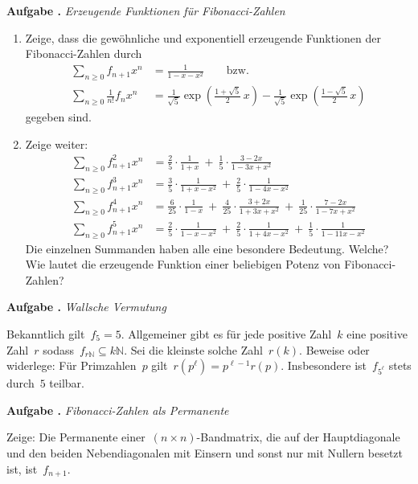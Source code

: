 \documentclass[a4paper,ngerman]{scrartcl}
\newlength{\aufgabenskip}
\newcounter{aufgabennummer}
\newenvironment{aufgabe}[1]{
  \addtocounter{aufgabennummer}{1}
  \textbf{Aufgabe \theaufgabennummer.} \emph{#1} \par
}{\vspace{\aufgabenskip}}
\newcommand{\NN}{\mathbb{N}}
\begin{document}
\begin{aufgabe}{Erzeugende Funktionen für Fibonacci-Zahlen}
\begin{enumerate}
\item Zeige, dass die gewöhnliche und exponentiell erzeugende Funktionen der
Fibonacci-Zahlen durch
\begin{align*}
  \sum_{n\geq 0} f_{n+1}x^n &= \frac{1}{1-x-x^2} \qquad\text{bzw.} \\
  \sum_{n\geq 0} \tfrac{1}{n!}f_n x^n &= \tfrac{1}{\sqrt{5}}\exp\left(\tfrac{1+\sqrt{5}}{2}\, x\right) - \tfrac{1}{\sqrt{5}}\exp\left(\tfrac{1-\sqrt{5}}{2}\, x\right)
\end{align*}
gegeben sind.
\item Zeige weiter:
\begin{align*}
\sum_{n\geq 0} f_{n+1}^2x^n &= \frac{2}{5}\cdot\frac{1}{1+x}\ +\ \frac{1}{5}\cdot\frac{3-2x}{1-3x+x^2}\\
\sum_{n\geq 0} f_{n+1}^3x^n &= \frac{3}{5}\cdot\frac{1}{1+x-x^2}\ +\ \frac{2}{5}\cdot\frac{1}{1-4x-x^2} \\
\sum_{n\geq 0} f_{n+1}^4x^n &= \frac{6}{25}\cdot\frac{1}{1-x}\ +\ \frac{4}{25}\cdot\frac{3+2x}{1+3x+x^2}\ +\ \frac{1}{25}\cdot\frac{7-2x}{1-7x+x^2}\\
\sum_{n\geq 0} f_{n+1}^5x^n &= \frac{2}{5}\cdot\frac{1}{1-x-x^2}\ +\ \frac{2}{5}\cdot\frac{1}{1+4x-x^2}\ +\ \frac{1}{5}\cdot\frac{1}{1-11x-x^2}
\end{align*}
Die einzelnen Summanden haben alle eine besondere Bedeutung. Welche? Wie lautet
die erzeugende Funktion einer beliebigen Potenz von Fibonacci-Zahlen?
\end{enumerate}
\end{aufgabe}

\begin{aufgabe}{Wallsche Vermutung}
Bekanntlich gilt~$f_5 = 5$. Allgemeiner gibt es für jede positive Zahl~$k$ eine
positive Zahl~$r$ sodass~$f_{r \NN} \subseteq k \NN$. Sei die kleinste solche
Zahl~$r(k)$. Beweise oder widerlege: Für Primzahlen~$p$ gilt~$r(p^\ell) =
p^{\ell-1} r(p)$. Insbesondere ist~$f_{5^\ell}$ stets durch~$5$ teilbar.
\end{aufgabe}

\begin{aufgabe}{Fibonacci-Zahlen als Permanente}
Zeige: Die Permanente einer~$(n \times n)$-Bandmatrix, die auf der
Hauptdiagonale und den beiden Nebendiagonalen mit Einsern und sonst nur mit
Nullern besetzt ist, ist~$f_{n+1}$.
\end{aufgabe}
\end{document}
